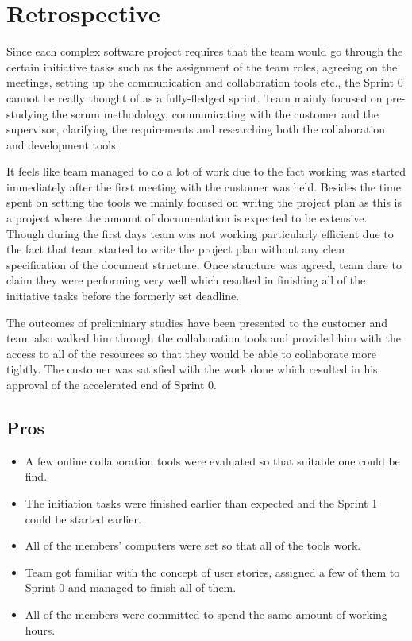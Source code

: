 \section{Retrospective}

Since each complex software project requires that the team would go through the certain initiative tasks such as the assignment of the team roles, agreeing on the meetings, setting up the communication and collaboration tools etc., the Sprint 0 cannot be really thought of as a fully-fledged sprint. Team mainly focused on pre-studying the scrum methodology, communicating with the customer and the supervisor, clarifying the requirements and researching both the collaboration and development tools.

It feels like team managed to do a lot of work due to the fact working was started immediately after the first meeting with the customer was held. Besides the time spent on setting the tools we mainly focused on writng the project plan as this is a project where the amount of documentation is expected to be extensive. Though during the first days team was not working particularly efficient due to the fact that team started to write the project plan without any clear specification of the document structure. Once structure was agreed, team dare to claim they were performing very well which resulted in finishing all of the initiative tasks before the formerly set deadline.

The outcomes of preliminary studies have been presented to the customer and team also walked him through the collaboration tools and provided him with the access to all of the resources so that they would be able to collaborate more tightly. The customer was satisfied with the work done which resulted in his approval of the accelerated end of Sprint 0.

\subsection{Pros}
\begin{itemize}
\item A few online collaboration tools were evaluated so that suitable one could be find.
\item The initiation tasks were finished earlier than expected and the Sprint 1 could be started earlier.
\item All of the members' computers were set so that all of the tools work.
\item Team got familiar with the concept of user stories, assigned a few of them to Sprint 0 and managed to finish all of them.
\item All of the members were committed to spend the same amount of working hours.
\end{itemize}

